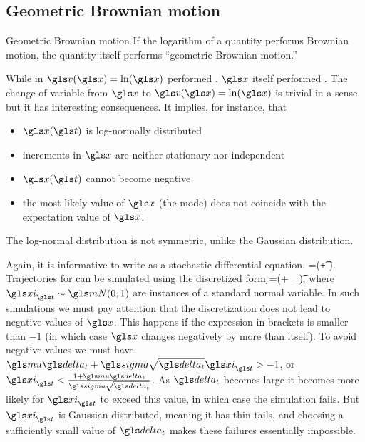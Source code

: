 \subsection{Geometric Brownian motion}
\begin{defn}{Geometric Brownian motion}
If the logarithm of a quantity performs Brownian motion, the quantity itself performs ``geometric Brownian 
motion.''
\end{defn}

While in  $\gv(\x)=\ln(\x)$ performed \BM, $\x$ 
itself performed \GBM. The change of variable from $\x$ 
to $\gv(\x)=\ln(\x)$ is trivial in a sense but it has interesting consequences. 
It implies, for instance, that 
\begin{itemize}
\item $\x(\t)$ is log-normally distributed
\item increments in $\x$ are neither stationary nor independent
\item $\x(\t)$ cannot become negative 
\item the most likely value of $\x$ (the mode) does not coincide with the 
expectation value of $\x$. 
\end{itemize}
The log-normal distribution is not symmetric, unlike the Gaussian 
distribution. 

Again, it is informative to write \GBM as a stochastic differential equation. 
\be
\gd\x=\x(\gmu \gd\t+ \gsigma \gd\gW).
\ee
Trajectories for \GBM can be simulated using the discretized form
\be
\d \x=\x(\gmu \dt+ \gsigma \sqrt{\dt} \gxi_\t),
\ee
where $\gxi_\t \sim \mN(0,1)$ are instances of a standard normal variable. In such simulations
we must pay attention that the discretization does not lead to negative values of $\x$. This 
happens if the expression in brackets is smaller than $-1$ (in which case $\x$ changes negatively by more than itself).
To avoid negative values we must have $\gmu \dt + \gsigma \sqrt{\dt} \gxi_\t>-1$, or 
$\gxi_\t <\frac{1+\gmu\dt}{\gsigma \sqrt{\dt}}$. As $\dt$ becomes large it becomes more likely for
$\gxi_\t$ to exceed this value, in which case the simulation fails. But $\gxi_\t$ is Gaussian distributed, meaning
it has thin tails, and choosing a sufficiently small value of $\dt$ makes these failures essentially impossible.

